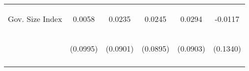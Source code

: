 \begin{center}
\begin{tabular}{lccccc}
\noalign{\smallskip}Gov. Size Index & \begin{scriptsize}0.0058\end{scriptsize} & \begin{scriptsize}0.0235\end{scriptsize} & \begin{scriptsize}0.0245\end{scriptsize} & \begin{scriptsize}0.0294\end{scriptsize} & \begin{scriptsize}-0.0117\end{scriptsize}\\
 & \begin{scriptsize}(0.0995)\end{scriptsize} & \begin{scriptsize}(0.0901)\end{scriptsize} & \begin{scriptsize}(0.0895)\end{scriptsize} & \begin{scriptsize}(0.0903)\end{scriptsize} & \begin{scriptsize}(0.1340)\end{scriptsize}\\
\noalign{\smallskip}\hline\end{tabular}\\
\end{center}
